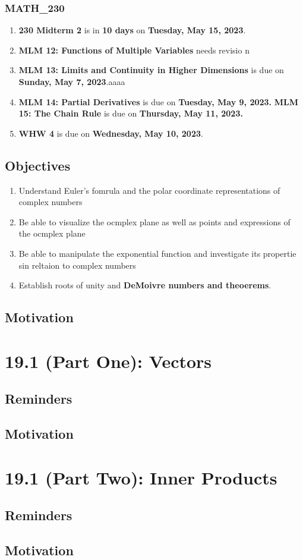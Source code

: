 \subsection{MATH\_230}
\begin{enumerate}
  \item \textbf{230 Midterm 2} is in \textbf{10 days} on
        \textbf{Tuesday, May 15, 2023}.
  \item \textbf{MLM 12: Functions of Multiple Variables} needs revisio n
  \item \textbf{MLM 13: Limits and Continuity in Higher
        Dimensions} is due on \textbf{Sunday, May 7, 2023}.aaaa
  \item \textbf{MLM 14: Partial Derivatives} is due on
        \textbf{Tuesday, May 9, 2023.}
        \textbf \textbf{MLM 15: The Chain Rule} is due on
        \textbf{Thursday, May 11, 2023.}
  \item \textbf{WHW 4} is due on \textbf{Wednesday,
        May 10, 2023}.

\end{enumerate}

\section{Objectives}
\begin{enumerate}
  \item Understand Euler's fomrula and the polar coordinate
        representations of complex numbers
  \item Be able to visualize the ocmplex plane as
        well as points and expressions of the ocmplex plane
  \item Be able to manipulate the exponential function
        and investigate its propertie sin reltaion to
        complex numbers
        \item Establish roots of unity and \textbf{DeMoivre numbers and theoerems}.

\end{enumerate}

\section{Motivation}
\chapter{19.1 (Part One): Vectors}
\section{Reminders}
\section{Motivation}
\chapter{19.1 (Part Two): Inner Products}
\section{Reminders}
\section{Motivation}
